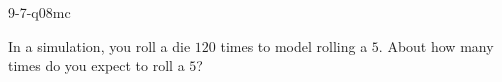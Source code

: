 \begin{practiceQuestion}{9-7-q08}{mc}
\begin{questionText}
In a simulation, you roll a die $120$ times to model rolling a $5$. About how many times do you expect to roll a $5$?
\end{questionText}
\end{practiceQuestion}
